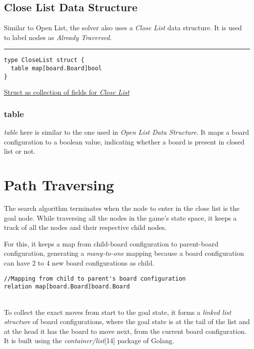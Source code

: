 \documentclass[a4paper]{article}
\begin{document}
\subsection{Close List Data Structure}

\textrm{\normalsize{Similar to Open List, the solver also uses a \textit{Close List} data structure. It is used to label nodes as
\textit{Already Traversed}.}}

\rule{\textwidth}{1pt}
\begin{verbatim}
type CloseList struct {
  table map[board.Board]bool
}
\end{verbatim}
\underline{Struct as collection of fields for \textit{Close List}}

\subsubsection{table}

\textrm{\normalsize{\textit{table} here is similar to the one used in \textit{Open List Data Structure}. It maps a board configuration to a boolean value,
indicating whether a board is present in closed list or not.\\}}

\section{Path Traversing}

\textrm{\normalsize{The search algorithm terminates when the node to enter in the close list is the goal node. While
traversing all the nodes in the game's state space, it keeps a track of all the nodes and their
respective child nodes.\\}}

\textrm{\normalsize{For this, it keeps a map from child-board configuration to parent-board configuration, generating a
\textit{many-to-one} mapping because a board configuration can have 2 to 4 new board configurations as
child.\\}}

\begin{verbatim}
//Mapping from child to parent's board configuration
relation map[board.Board]board.Board
\end{verbatim}

\textrm{\normalsize{\\To collect the exact moves from start to the goal state, it forms a \textit{linked list structure} of board
configurations, where the goal state is at the tail of the list and at the head it has the board to move
next, from the current board configuration. It is built using the \textit{container/list}[14] package of
Golang.\\}}
\end{document}
